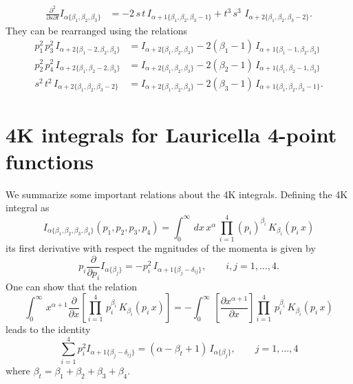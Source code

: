 \documentclass[a4paper,11pt,openright,twoside]{book}
\let\a=\alpha   \let\b=\beta   \let\g=\gamma   \let\d=\delta
\numberwithin{equation}{section}
\begin{document}
{{\begin{align}
	\frac{\partial^2}{\partial s\partial t}I_{\a\{\b_1,\b_2,\b_3\}}&=-2\,s\,t\,I_{\a+1\{\b_1,\b_2,\b_3-1\}}+t^3\,s^3\,\,I_{\a+2\{\b_1,\b_2,\b_3-2\}}.
\end{align}
They can be rearranged using the relations
\begin{align}
	p_1^2\,p_3^2\,I_{\a+2\{\b_1-2,\b_2,\b_3\}}&=I_{\a+2\{\b_1,\b_2,\b_3\}}-2(\b_1-1)\,I_{\a+1\{\b_1-1,\b_2,\b_3\}}\\
	p_2^2\,p_4^2\,I_{\a+2\{\b_1,\b_2-2,\b_3\}}&=I_{\a+2\{\b_1,\b_2,\b_3\}}-2(\b_2-1)\,I_{\a+1\{\b_1,\b_2-1,\b_3\}}\\
	s^2\,t^2\,I_{\a+2\{\b_1,\b_2,\b_3-2\}}&=I_{\a+2\{\b_1,\b_2,\b_3\}}-2(\b_3-1)\,I_{\a+1\{\b_1,\b_2,\b_3-1\}}.
\end{align}

\section{4K integrals for Lauricella 4-point functions}\label{AppendixB}
We summarize some important relations about the 4K integrals. Defining the 4K integral as
\begin{equation}
	I_{\a\{\b_1,\b_2,\b_3,\b_4\}}(p_1,p_2,p_3,p_4)=\int_0^\infty\,dx\,x^\a\,\prod_{i=1}^4(p_i)^{\b_i}\,K_{\b_i}(p_i\,x)
\end{equation}
its first derivative with respect the mgnitudes of the momenta is given by
\begin{equation}
	p_i\frac{\partial}{\partial p_i}I_{\a\{\b_j\}}=-p_i^2\,I_{\a+1\{\b_j-\d_{ij}\}},\qquad i,j=1,\dots,4.
\end{equation}
One can show that the relation
\begin{equation}
	\int_0^\infty\,x^{\a+1}\frac{\partial}{\partial x}\left[\prod_{i=1}^4\,p_i^{\b_i}\,K_{\b_i}(p_i\,x)\right]=-\int_0^\infty\,\left[\frac{\partial x^{\a+1}}{\partial x}\right]\prod_{i=1}^4\,p_i^{\b_i}\,K_{\b_i}(p_i\,x)
\end{equation}
leads to the identity
\begin{equation}
	\sum_{i=1}^{4}p_i^2I_{\a+1\{\b_j-\d_{ij}\}}=(\a-\b_t+1)\,I_{\a\{\b_j\}},\qquad j=1,\dots,4
\end{equation}
where $\b_t=\b_1+\b_2+\b_3+\b_4$. 

}}
\end{document}

